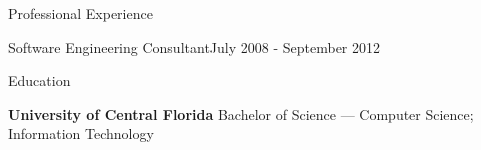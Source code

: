 \documentclass{resume} %
\begin{document}
\begin{rSection}{Professional Experience}
  
  \begin{rCompany}{Software Engineering Consultant}{July 2008 - September 2012}{}

  \end{rCompany}
  
  
  
\end{rSection}

\vspace{0.5em} %
\begin{rSection}{Education}
  
  {\bf University of Central Florida } Bachelor of Science --- Computer Science; Information Technology
  
\end{rSection}
\end{document}
